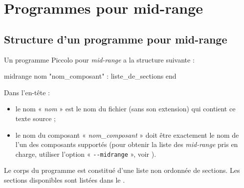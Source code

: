 

\chapter{Programmes pour mid-range}

\thispagestyle{empty}




\section{Structure d’un programme pour mid-range}

Un programme Piccolo pour \emph{mid-range} a la structure suivante :

\begin{piccolo}
midrange nom "nom_composant" :
  liste_de_sections
end
\end{piccolo}


Dans l’en-tête :
\begin{itemize}
  \item le nom « \emph{nom} » est le nom du fichier (sans son extension) qui contient ce texte source ;
  \item le nom du composant « \emph{nom\_composant} » doit être exactement le nom de l’un des composants supportés (pour obtenir la liste des \emph{mid-range} pris en charge, utiliser l’option « \texttt{-{}-midrange} », voir ).
\end{itemize}


Le corps du programme est constitué d’une liste non ordonnée de sections. Les sections disponibles sont listées dans le .

